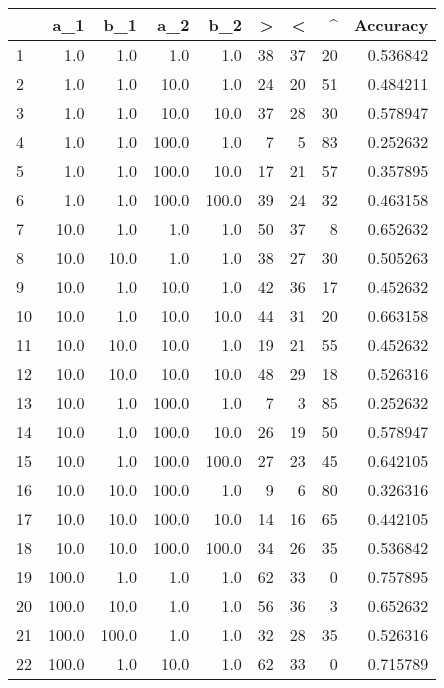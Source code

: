\begin{tabular}{lrrrrrrrr}
\toprule
{} &    a\_1 &    b\_1 &    a\_2 &    b\_2 &   > &   < &   \textasciicircum  &  Accuracy \\
\midrule
1  &    1.0 &    1.0 &    1.0 &    1.0 &  38 &  37 &  20 &  0.536842 \\
2  &    1.0 &    1.0 &   10.0 &    1.0 &  24 &  20 &  51 &  0.484211 \\
3  &    1.0 &    1.0 &   10.0 &   10.0 &  37 &  28 &  30 &  0.578947 \\
4  &    1.0 &    1.0 &  100.0 &    1.0 &   7 &   5 &  83 &  0.252632 \\
5  &    1.0 &    1.0 &  100.0 &   10.0 &  17 &  21 &  57 &  0.357895 \\
6  &    1.0 &    1.0 &  100.0 &  100.0 &  39 &  24 &  32 &  0.463158 \\
7  &   10.0 &    1.0 &    1.0 &    1.0 &  50 &  37 &   8 &  0.652632 \\
8  &   10.0 &   10.0 &    1.0 &    1.0 &  38 &  27 &  30 &  0.505263 \\
9  &   10.0 &    1.0 &   10.0 &    1.0 &  42 &  36 &  17 &  0.452632 \\
10 &   10.0 &    1.0 &   10.0 &   10.0 &  44 &  31 &  20 &  0.663158 \\
11 &   10.0 &   10.0 &   10.0 &    1.0 &  19 &  21 &  55 &  0.452632 \\
12 &   10.0 &   10.0 &   10.0 &   10.0 &  48 &  29 &  18 &  0.526316 \\
13 &   10.0 &    1.0 &  100.0 &    1.0 &   7 &   3 &  85 &  0.252632 \\
14 &   10.0 &    1.0 &  100.0 &   10.0 &  26 &  19 &  50 &  0.578947 \\
15 &   10.0 &    1.0 &  100.0 &  100.0 &  27 &  23 &  45 &  0.642105 \\
16 &   10.0 &   10.0 &  100.0 &    1.0 &   9 &   6 &  80 &  0.326316 \\
17 &   10.0 &   10.0 &  100.0 &   10.0 &  14 &  16 &  65 &  0.442105 \\
18 &   10.0 &   10.0 &  100.0 &  100.0 &  34 &  26 &  35 &  0.536842 \\
19 &  100.0 &    1.0 &    1.0 &    1.0 &  62 &  33 &   0 &  0.757895 \\
20 &  100.0 &   10.0 &    1.0 &    1.0 &  56 &  36 &   3 &  0.652632 \\
21 &  100.0 &  100.0 &    1.0 &    1.0 &  32 &  28 &  35 &  0.526316 \\
22 &  100.0 &    1.0 &   10.0 &    1.0 &  62 &  33 &   0 &  0.715789 \\

\end{tabular}
